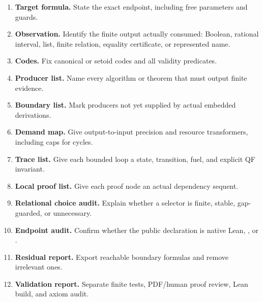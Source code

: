 \begin{enumerate}
\item \textbf{Target formula.} State the exact  endpoint, including free parameters and guards.
\item \textbf{Observation.} Identify the finite output actually consumed: Boolean, rational interval, list, finite relation, equality certificate, or represented name.
\item \textbf{Codes.} Fix canonical or setoid codes and all validity predicates.
\item \textbf{Producer list.} Name every algorithm or theorem that must output finite evidence.
\item \textbf{Boundary list.} Mark producers not yet supplied by actual embedded derivations.
\item \textbf{Demand map.} Give output-to-input precision and resource transformers, including caps for cycles.
\item \textbf{Trace list.} Give each bounded loop a state, transition, fuel, and explicit QF invariant.
\item \textbf{Local proof list.} Give each proof node an actual dependency sequent.
\item \textbf{Relational choice audit.} Explain whether a selector is finite, stable, gap-guarded, or unnecessary.
\item \textbf{Endpoint audit.} Confirm whether the public declaration is native Lean, , or .
\item \textbf{Residual report.} Export reachable boundary formulas and remove irrelevant ones.
\item \textbf{Validation report.} Separate finite tests, PDF/human proof review, Lean build, and axiom audit.
\end{enumerate}
